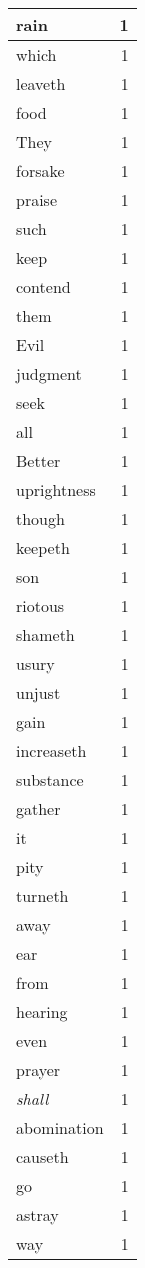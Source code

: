 \begin{center}
\begin{longtable}{l|r}
rain & 1\\ \hline 
which & 1\\ \hline 
leaveth & 1\\ \hline 
food & 1\\ \hline 
They & 1\\ \hline 
forsake & 1\\ \hline 
praise & 1\\ \hline 
such & 1\\ \hline 
keep & 1\\ \hline 
contend & 1\\ \hline 
them & 1\\ \hline 
Evil & 1\\ \hline 
judgment & 1\\ \hline 
seek & 1\\ \hline 
all & 1\\ \hline 
Better & 1\\ \hline 
uprightness & 1\\ \hline 
though & 1\\ \hline 
keepeth & 1\\ \hline 
son & 1\\ \hline 
riotous & 1\\ \hline 
shameth & 1\\ \hline 
usury & 1\\ \hline 
unjust & 1\\ \hline 
gain & 1\\ \hline 
increaseth & 1\\ \hline 
substance & 1\\ \hline 
gather & 1\\ \hline 
it & 1\\ \hline 
pity & 1\\ \hline 
turneth & 1\\ \hline 
away & 1\\ \hline 
ear & 1\\ \hline 
from & 1\\ \hline 
hearing & 1\\ \hline 
even & 1\\ \hline 
prayer & 1\\ \hline 
\emph{shall} & 1\\ \hline 
abomination & 1\\ \hline 
causeth & 1\\ \hline 
go & 1\\ \hline 
astray & 1\\ \hline 
way & 1\\ \hline 

\end{longtable}
\end{center}

